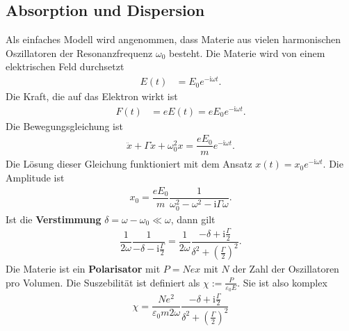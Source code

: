 \documentclass[a4paper,12pt]{article}
\numberwithin{equation}{section}
\begin{document}
\subsection{Absorption und Dispersion}
Als einfaches Modell wird angenommen, dass Materie aus vielen harmonischen Oszillatoren der Resonanzfrequenz $\omega _0$ besteht. Die Materie wird von einem elektrischen Feld durchsetzt
\begin{align} 
        E\left(t\right)&=E_0e^{-\text{i}\omega t}
.\end{align} 
Die Kraft, die auf das Elektron wirkt ist
\begin{align} 
        F\left(t\right)&=eE\left(t\right)=eE_0e^{-\text{i}\omega t}
.\end{align} 
Die Bewegungsgleichung ist
\begin{align} 
        \ddot{x}+\Gamma \dot{x}+\omega _0^2x=\dfrac{eE_0}{m}e^{-\text{i}\omega t}
.\end{align} 
Die Lösung dieser Gleichung funktioniert mit dem Ansatz $x\left(t\right)=x_0e^{-\text{i}\omega t}$. Die Amplitude ist
\begin{align} 
        x_0=\dfrac{eE_0}{m}\dfrac{1}{\omega _0^2-\omega ^2-\text{i}\Gamma \omega }
.\end{align} 
Ist die \textbf{Verstimmung} $\delta =\omega -\omega _0\ll \omega $, dann gilt
\begin{align} 
        \dfrac{1}{2\omega }\dfrac{1}{-\delta -\text{i}\tfrac{\Gamma }{2}}=\dfrac{1}{2\omega }\dfrac{-\delta +\text{i}\tfrac{\Gamma }{2}}{\delta ^2+\left(\tfrac{\Gamma }{2}\right)^2}
.\end{align} 
Die Materie ist ein \textbf{Polarisator} mit $P=Nex$ mit $N$ der Zahl der Oszillatoren pro Volumen. Die Suszebilität ist definiert als $\chi:=\tfrac{P}{\varepsilon _0E}$. Sie ist also komplex
\begin{align} 
        \chi=\dfrac{Ne^2}{\varepsilon _0m2\omega }\dfrac{-\delta +\text{i}\tfrac{\Gamma }{2}}{\delta ^2+\left(\tfrac{\Gamma }{2}\right)^2}
\end{align} 


\end{document}
